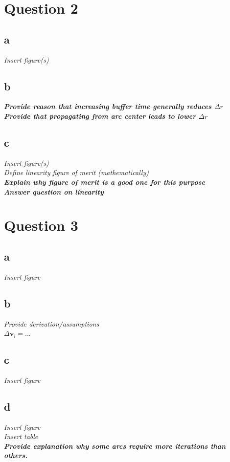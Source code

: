 \documentclass{report}
\begin{document}
\section*{Question 2}

\subsection*{a}
\textit{Insert figure(s)}

\subsection*{b}
\textbf{\textit{Provide reason that increasing buffer time generally reduces $\Delta r$ }}\\
\textbf{\textit{Provide that propagating from arc center leads to lower $\Delta r$}}

\subsection*{c}

\textit{Insert figure(s)}\\
\textit{Define linearity figure of merit (mathematically)}\\
\textbf{\textit{Explain why figure of merit is a good one for this purpose}}\\
\textbf{\textit{Answer question on linearity}}\\

\clearpage
\section*{Question 3}

\subsection*{a}
\textit{Insert figure}
\subsection*{b}
\textit{Provide derivation/assumptions}\\
$\Delta \mathbf{v}_{i}=...$

\subsection*{c}
\textit{Insert figure}\\

\subsection*{d}
\textit{Insert figure}\\
\textit{Insert table}\\
\textbf{\textit{Provide explanation why some arcs require more iterations than others.}}
\end{document}
